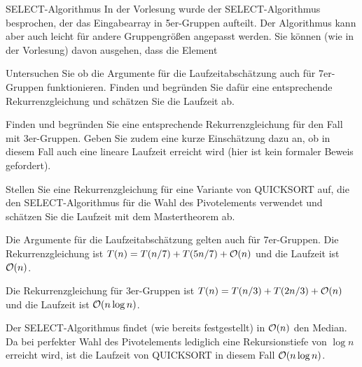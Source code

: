 \documentclass{exercisesheet}
\begin{document}
\begin{eexercises}{SELECT-Algorithmus}{
    In der Vorlesung wurde der SELECT-Algorithmus besprochen, der das Eingabearray in 5er-Gruppen aufteilt. Der Algorithmus kann aber auch leicht für andere Gruppengrößen angepasst werden. Sie können (wie in der Vorlesung) davon ausgehen, dass die Element
  }
  \item Untersuchen Sie ob die Argumente für die Laufzeitabschätzung auch für 7er-Gruppen funktionieren. Finden und begründen Sie dafür eine entsprechende Rekurrenzgleichung und schätzen Sie die Laufzeit ab.
  \item Finden und begründen Sie eine entsprechende Rekurrenzgleichung für den Fall mit 3er-Gruppen. Geben Sie zudem eine kurze Einschätzung dazu an, ob in diesem Fall auch eine lineare Laufzeit erreicht wird (hier ist kein formaler Beweis gefordert).
  \item Stellen Sie eine Rekurrenzgleichung für eine Variante von QUICKSORT auf, die den SELECT-Algorithmus für die Wahl des Pivotelements verwendet und schätzen Sie die Laufzeit mit dem Mastertheorem ab.
\end{eexercises}

\begin{solutions}
  \item Die Argumente für die Laufzeitabschätzung gelten auch für 7er-Gruppen. Die Rekurrenzgleichung ist $T(n) = T(n/7) + T(5n/7) + \mathcal{O}(n)$ und die Laufzeit ist $\mathcal{O}(n)$.
  \item Die Rekurrenzgleichung für 3er-Gruppen ist $T(n) = T(n/3) + T(2n/3) + \mathcal{O}(n)$ und die Laufzeit ist $\mathcal{O}(n \log n)$.
  \item Der SELECT-Algorithmus findet (wie bereits festgestellt) in $\mathcal{O}(n)$ den Median. Da bei perfekter Wahl des Pivotelements lediglich eine Rekursionstiefe von $\log n$ erreicht wird, ist die Laufzeit von QUICKSORT in diesem Fall $\mathcal{O}(n \log n)$.
\end{solutions}
\end{document}
